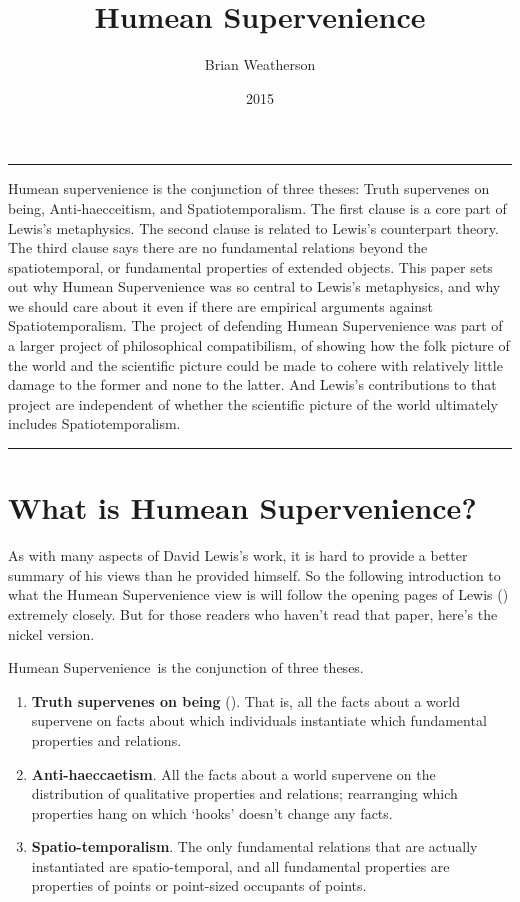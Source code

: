 \documentclass[
  10pt,
  letterpaper,
  DIV=11,
  numbers=noendperiod,
  twoside]{scrartcl}
\title{Humean Supervenience}
\author{Brian Weatherson}
\date{2015}
\providecommand{\tightlist}{%
  \setlength{\itemsep}{0pt}\setlength{\parskip}{0pt}}\usepackage{longtable,booktabs,array}
\renewenvironment{abstract}
 {\vspace{-1.25cm}
 \quotation\small\noindent\rule{\linewidth}{.5pt}\par\smallskip
 \noindent }
 {\par\noindent\rule{\linewidth}{.5pt}\endquotation}
\begin{document}
\maketitle
\begin{abstract}
Humean supervenience is the conjunction of three theses: Truth
supervenes on being, Anti‐haecceitism, and Spatiotemporalism. The first
clause is a core part of Lewis's metaphysics. The second clause is
related to Lewis's counterpart theory. The third clause says there are
no fundamental relations beyond the spatiotemporal, or fundamental
properties of extended objects. This paper sets out why Humean
Supervenience was so central to Lewis's metaphysics, and why we should
care about it even if there are empirical arguments against
Spatiotemporalism. The project of defending Humean Supervenience was
part of a larger project of philosophical compatibilism, of showing how
the folk picture of the world and the scientific picture could be made
to cohere with relatively little damage to the former and none to the
latter. And Lewis's contributions to that project are independent of
whether the scientific picture of the world ultimately includes
Spatiotemporalism.
\end{abstract}

\section{What is Humean
Supervenience?}\label{what-is-humean-supervenience}

As with many aspects of David Lewis's work, it is hard to provide a
better summary of his views than he provided himself. So the following
introduction to what the Humean Supervenience view is will follow the
opening pages of Lewis () extremely
closely. But for those readers who haven't read that paper, here's the
nickel version.

Humean Supervenience~is the conjunction of three theses.

\begin{enumerate}
\def\labelenumi{\arabic{enumi}.}
\tightlist
\item
  \textbf{Truth supervenes on being} (). That is, all the facts about a world supervene on facts about
  which individuals instantiate which fundamental properties and
  relations.
\item
  \textbf{Anti-haeccaetism}. All the facts about a world supervene on
  the distribution of qualitative properties and relations; rearranging
  which properties hang on which `hooks' doesn't change any facts.
\item
  \textbf{Spatio-temporalism}. The only fundamental relations that are
  actually instantiated are spatio-temporal, and all fundamental
  properties are properties of points or point-sized occupants of
  points.
\end{enumerate}
\end{document}
